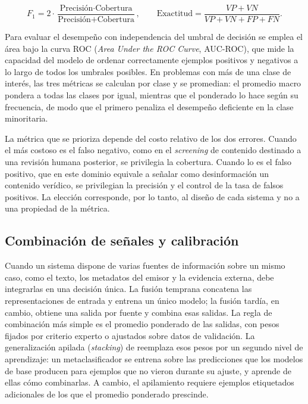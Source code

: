 \begin{equation}
  F_1 = 2 \cdot \frac{\text{Precisión} \cdot \text{Cobertura}}{\text{Precisión} + \text{Cobertura}}, \qquad
  \text{Exactitud} = \frac{VP + VN}{VP + VN + FP + FN}.
  \label{eq:f1-exactitud}
\end{equation}

Para evaluar el desempeño con independencia del umbral de decisión se emplea el área bajo la curva ROC (\textit{Area Under the ROC Curve}, AUC-ROC), que mide la capacidad del modelo de ordenar correctamente ejemplos positivos y negativos a lo largo de todos los umbrales posibles. En problemas con más de una clase de interés, las tres métricas se calculan por clase y se promedian: el promedio macro pondera a todas las clases por igual, mientras que el ponderado lo hace según su frecuencia, de modo que el primero penaliza el desempeño deficiente en la clase minoritaria.

La métrica que se prioriza depende del costo relativo de los dos errores. Cuando el más costoso es el falso negativo, como en el \textit{screening} de contenido destinado a una revisión humana posterior, se privilegia la cobertura. Cuando lo es el falso positivo, que en este dominio equivale a señalar como desinformación un contenido verídico, se privilegian la precisión y el control de la tasa de falsos positivos. La elección corresponde, por lo tanto, al diseño de cada sistema y no a una propiedad de la métrica.

\subsection{Combinación de señales y calibración}
\label{sec:combinacion-calibracion}

Cuando un sistema dispone de varias fuentes de información sobre un mismo caso, como el texto, los metadatos del emisor y la evidencia externa, debe integrarlas en una decisión única. La fusión temprana concatena las representaciones de entrada y entrena un único modelo; la fusión tardía, en cambio, obtiene una salida por fuente y combina esas salidas. La regla de combinación más simple es el promedio ponderado de las salidas, con pesos fijados por criterio experto o ajustados sobre datos de validación. La generalización apilada (\textit{stacking}) de \textcite{Wolpert1992} reemplaza esos pesos por un segundo nivel de aprendizaje: un metaclasificador se entrena sobre las predicciones que los modelos de base producen para ejemplos que no vieron durante su ajuste, y aprende de ellas cómo combinarlas. A cambio, el apilamiento requiere ejemplos etiquetados adicionales de los que el promedio ponderado prescinde.

